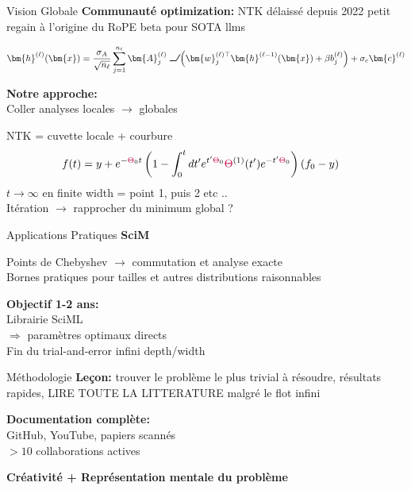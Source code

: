 \documentclass{beamer}
\DeclareRobustCommand{\ReLU}{\mathrel{\text{%
\begin{tikzpicture}[baseline=(current bounding box.south)]
    \draw[thick] (0,0) -- (0.25,0) -- (0.4,0.25);
\end{tikzpicture}}}\!\!}
\begin{document}
\begin{frame}{Vision Globale}
\textbf{Communauté optimization:} NTK délaissé depuis 2022
petit regain à l'origine du RoPE beta pour SOTA llms

\begin{align}
    \bm{h}^{(\ell)}(\bm{x}) = \frac{\sigma_A}{\sqrt{n_\ell}} \sum_{j=1}^{n_\ell} \bm{A}_j^{(\ell)} \ReLU\left(\bm{w}_j^{(\ell)\top} \bm{h}^{(\ell-1)}(\bm{x}) + \beta b_j^{(\ell)}\right) + \sigma_c \bm{c}^{(\ell)} \label{eq:ntk_rope_beta}
\end{align}

\vspace{0.5cm}

\textbf{Notre approche:}\\
Coller analyses locales $\rightarrow$ globales

NTK = cuvette locale + courbure\\
\begin{align}
    f(t) &= y + e^{-\textcolor{purple}{\Theta}_{0}t}\left(1-\int_{0}^{t}dt'e^{t'\textcolor{purple}{\Theta}_{0}}\textcolor{purple}{\Theta}^{(1)}(t')e^{-t'\textcolor{purple}{\Theta}_{0}}\right)\left(f_{0}-y\right) \label{eq:evolution_solution}
    \end{align}
$t \to \infty$ en finite width = point 1, puis 2 etc .. \\
Itération $\rightarrow$ rapprocher du minimum global ?
\end{frame}

\begin{frame}{Applications Pratiques}
\textbf{SciM}

Points de Chebyshev $\rightarrow$ commutation et analyse exacte\\
Bornes pratiques pour tailles et autres distributions raisonnables

\vspace{0.5cm}

\textbf{Objectif 1-2 ans:}\\ 
Librairie SciML\\
$\Rightarrow$ paramètres optimaux directs\\
Fin du trial-and-error infini depth/width
\end{frame}

\begin{frame}{Méthodologie}
\textbf{Leçon:} trouver le problème le plus trivial à résoudre, résultats rapides, 
LIRE TOUTE LA LITTERATURE malgré le flot infini

\vspace{0.5cm}

\textbf{Documentation complète:}\\
GitHub, YouTube, papiers scannés\\
$>10$ collaborations actives

\vspace{0.5cm}

\textbf{Créativité + Représentation mentale du problème}\\
\end{frame}
\end{document}
